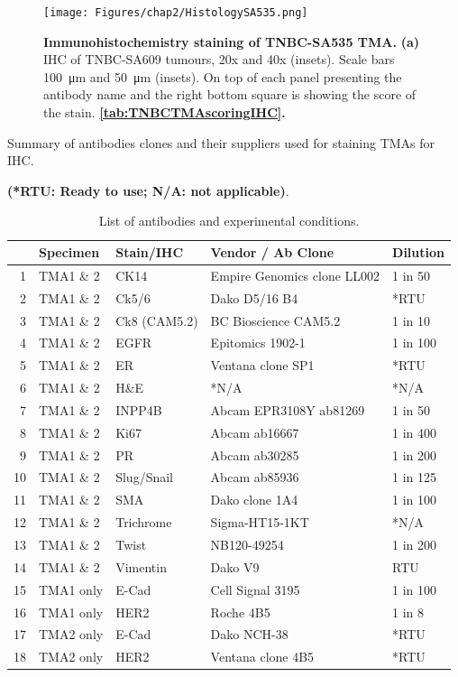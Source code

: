  \begin{figure}
\centering
\texttt{[image: Figures/chap2/HistologySA535.png]}
	
\caption[]
	{\small
\textbf{Immunohistochemistry staining of TNBC-SA535 TMA.}
 \textbf{(a)} IHC of TNBC-SA609 tumours, 20x and 40x (insets). Scale bars \SI{100}{\micro\metre} and \SI{50}{\micro\metre} (insets). On top of each panel presenting the antibody name and the right bottom square is showing the score of the stain. \textbf{\autoref{tab:TNBCTMAscoringIHC}.}}
	\label{fig:HistologySA535}
\end{figure}

\begin{table}
\centering
\caption{List of antibodies and experimental conditions.}
Summary of antibodies clones and their suppliers used for staining TMAs for IHC.

\small\textbf{(*RTU: Ready to use; N/A: not applicable)}.
\label{stab:antibodieslist}
\begin{tabular}{|rl|l|l|l|}
  \hline
 & Specimen & Stain/IHC & Vendor / Ab Clone & Dilution  \\ 
  \hline
1 & TMA1 \& 2 & CK14 & Empire Genomics clone LL002 & 1 in 50 \\ 
  2 & TMA1 \& 2 & Ck5/6 & Dako D5/16 B4 & *RTU  \\ 
  3 & TMA1 \& 2 & Ck8 (CAM5.2) & BC Bioscience CAM5.2 & 1 in 10  \\ 
  4 & TMA1 \& 2 & EGFR & Epitomics 1902-1 & 1 in 100  \\ 
  5 & TMA1 \& 2 & ER & Ventana  clone SP1 & *RTU\\ 
  6 & TMA1 \& 2 & H\&E & *N/A & *N/A \\ 
  7 & TMA1 \& 2 & INPP4B & Abcam EPR3108Y ab81269 & 1 in 50 \\ 
  8 & TMA1 \& 2 & Ki67 & Abcam ab16667  & 1 in 400  \\ 
  9 & TMA1 \& 2 & PR & Abcam ab30285 & 1 in 200  \\ 
  10 & TMA1 \& 2 & Slug/Snail & Abcam ab85936 & 1 in 125 \\ 
  11 & TMA1 \& 2 & SMA & Dako clone 1A4 & 1 in 100 \\ 
  12 & TMA1 \& 2 & Trichrome & Sigma-HT15-1KT & *N/A \\ 
  13 & TMA1 \& 2 & Twist & NB120-49254 & 1 in 200\\ 
  14 & TMA1 \& 2 & Vimentin & Dako V9 & RTU  \\ 
  15 & TMA1 only & E-Cad & Cell Signal 3195 & 1 in 100  \\ 
  16 & TMA1 only & HER2 & Roche 4B5 & 1 in 8  \\ 
  17 & TMA2 only & E-Cad & Dako NCH-38 & *RTU  \\ 
  18 & TMA2 only & HER2 & Ventana  clone 4B5 & *RTU \\ 
   \hline
\end{tabular}%
\end{table}


